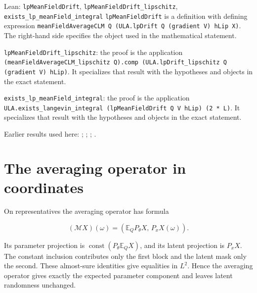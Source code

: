 \documentclass[11pt,a4paper]{article}
\begin{document}
\begin{leanbox}{Lean: \texttt{lpMeanFieldDrift}, \texttt{lpMeanFieldDrift\_\allowbreak{}lipschitz}, \texttt{exists\_\allowbreak{}lp\_\allowbreak{}meanField\_\allowbreak{}integral}}
\texttt{lp\allowbreak{}Mean\allowbreak{}Field\allowbreak{}Drift} is a definition with defining expression \texttt{mean\allowbreak{}Field\allowbreak{}Average\allowbreak{}CLM Q (ULA.\allowbreak{}lp\allowbreak{}Drift Q (gradient V) h\allowbreak{}Lip X)}. The right-hand side specifies the object used in the mathematical statement.



\texttt{lp\allowbreak{}Mean\allowbreak{}Field\allowbreak{}Drift\_\allowbreak{}lipschitz}: the proof is the application \texttt{(mean\allowbreak{}Field\allowbreak{}Average\allowbreak{}CLM\_\allowbreak{}lipschitz Q).\allowbreak{}comp (ULA.\allowbreak{}lp\allowbreak{}Drift\_\allowbreak{}lipschitz Q (gradient V) h\allowbreak{}Lip)}. It specializes that result with the hypotheses and objects in the exact statement.



\texttt{exists\_\allowbreak{}lp\_\allowbreak{}mean\allowbreak{}Field\_\allowbreak{}integral}: the proof is the application \texttt{ULA.\allowbreak{}exists\_\allowbreak{}langevin\_\allowbreak{}integral (lp\allowbreak{}Mean\allowbreak{}Field\allowbreak{}Drift Q V h\allowbreak{}Lip) (2 * L)}. It specializes that result with the hypotheses and objects in the exact statement.
\end{leanbox}


Earlier results used here: \cite[Section~3.13.2]{LangevinLean2026ULASC}; \cite[Section~3.13.5]{LangevinLean2026ULASC}; \cite[Section~3.14.3]{LangevinLean2026ULASC}; \cite[Section~3.1.1]{LangevinLean2026IPLA}.

\section{\texorpdfstring{The averaging operator in coordinates}{The averaging operator in coordinates}}


On representatives the averaging operator has formula

\[(\mathcal M X)(\omega)=(\mathbb E_Q P_\theta X,\,P_xX(\omega)).\]

Its parameter projection is \(\operatorname{const}(P_\theta\mathbb E_QX)\), and its latent projection is \(P_xX\). The constant inclusion contributes only the first block and the latent mask only the second. These almost-sure identities give equalities in \(L^2\). Hence the averaging operator gives exactly the expected parameter component and leaves latent randomness unchanged.
\end{document}
